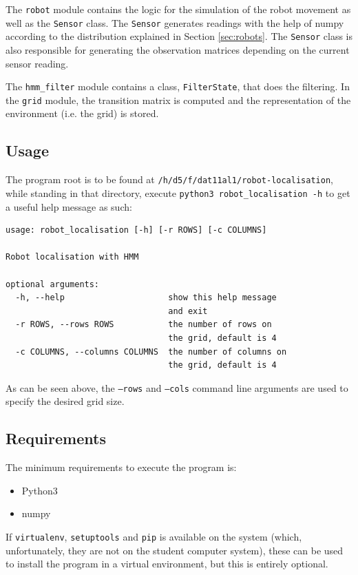 \documentclass{article}
\begin{document}
The \texttt{robot} module contains the logic for the simulation of the robot movement as well as the \texttt{Sensor} class. The \texttt{Sensor} generates readings with the help of numpy according to the distribution explained in Section \ref{sec:robots}. The \texttt{Sensor} class is also responsible for generating the observation matrices depending on the current sensor reading. 

The \texttt{hmm\_filter} module contains a class, \texttt{FilterState}, that does the filtering.
In the \texttt{grid} module, the transition matrix is computed and the representation of the environment (i.e. the grid) is stored. 

\subsection{Usage}
The program root is to be found at \texttt{/h/d5/f/dat11al1/robot-localisation}, while standing in that directory, execute \texttt{python3 robot\_localisation -h} to get a useful help message as such:
\begin{lstlisting}
usage: robot_localisation [-h] [-r ROWS] [-c COLUMNS]

Robot localisation with HMM

optional arguments:
  -h, --help                     show this help message
                                 and exit
  -r ROWS, --rows ROWS           the number of rows on
                                 the grid, default is 4
  -c COLUMNS, --columns COLUMNS  the number of columns on
                                 the grid, default is 4
\end{lstlisting}
As can be seen above, the \texttt{--rows} and \texttt{--cols} command line arguments are used to specify the desired grid size.

\subsection{Requirements}
The minimum requirements to execute the program is:

\begin{itemize}
    \item Python3
    \item numpy
\end{itemize}
If \texttt{virtualenv}, \texttt{setuptools} and \texttt{pip} is available on the system (which, unfortunately, they are not on the student computer system), these can be used to install the program in a virtual environment, but this is entirely optional.
\end{document}
